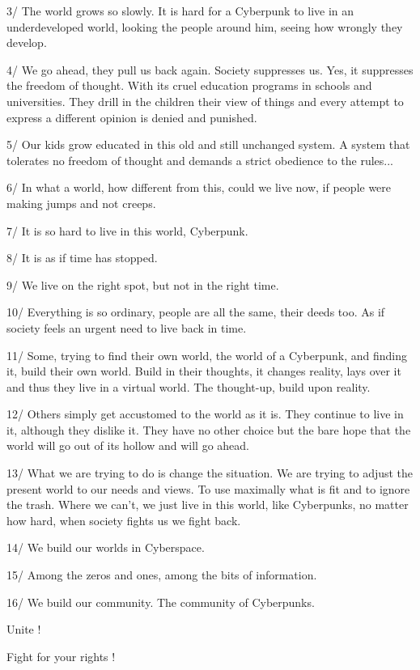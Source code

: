 \documentclass[letterpaper,12pt,english]{sphinxmanual}
\begin{document}
3/ The world grows so slowly. It is hard for a Cyberpunk to live in an underdeveloped world, looking the people around him, seeing how wrongly they develop.

4/ We go ahead, they pull us back again. Society suppresses us. Yes, it suppresses the freedom of thought. With its cruel education programs in schools and universities. They drill in the children their view of things and every attempt to express a different opinion is denied and punished.

5/ Our kids grow educated in this old and still unchanged system. A system that tolerates no freedom of thought and demands a strict obedience to the rules...

6/ In what a world, how different from this, could we live now, if people were making jumps and not creeps.

7/ It is so hard to live in this world, Cyberpunk.

8/ It is as if time has stopped.

9/ We live on the right spot, but not in the right time.

10/ Everything is so ordinary, people are all the same, their deeds too. As if society feels an urgent need to live back in time.

11/ Some, trying to find their own world, the world of a Cyberpunk, and finding it, build their own world. Build in their thoughts, it changes reality, lays over it and thus they live in a virtual world. The thought-up, build upon reality.

12/ Others simply get accustomed to the world as it is. They continue to live in it, although they dislike it. They have no other choice but the bare hope that the world will go out of its hollow and will go ahead.

13/ What we are trying to do is change the situation. We are trying to adjust the present world to our needs and views. To use maximally what is fit and to ignore the trash. Where we can't, we just live in this world, like Cyberpunks, no matter how hard, when society fights us we fight back.

14/ We build our worlds in Cyberspace.

15/ Among the zeros and ones, among the bits of information.

16/ We build our community. The community of Cyberpunks.

Unite !

Fight for your rights !

\end{document}
